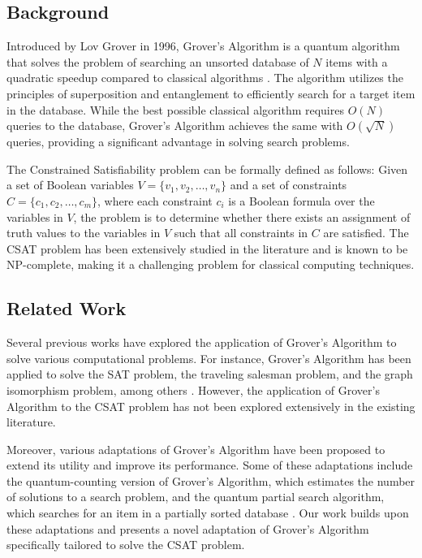 \subsection{Background}

Introduced by Lov Grover in 1996, Grover's Algorithm is a quantum algorithm that solves the problem of searching an unsorted database of $N$ items with a quadratic speedup compared to classical algorithms \cite{grover1996fast}. The algorithm utilizes the principles of superposition and entanglement to efficiently search for a target item in the database. While the best possible classical algorithm requires $O(N)$ queries to the database, Grover's Algorithm achieves the same with $O(\sqrt{N})$ queries, providing a significant advantage in solving search problems.

The Constrained Satisfiability problem can be formally defined as follows: Given a set of Boolean variables $V = \{v_1, v_2, \dots, v_n\}$ and a set of constraints $C = \{c_1, c_2, \dots, c_m\}$, where each constraint $c_i$ is a Boolean formula over the variables in $V$, the problem is to determine whether there exists an assignment of truth values to the variables in $V$ such that all constraints in $C$ are satisfied. The CSAT problem has been extensively studied in the literature and is known to be NP-complete, making it a challenging problem for classical computing techniques.

\subsection{Related Work}

Several previous works have explored the application of Grover's Algorithm to solve various computational problems. For instance, Grover's Algorithm has been applied to solve the SAT problem, the traveling salesman problem, and the graph isomorphism problem, among others \cite{brassard1998quantum,durr1996quantum,shenvi2002quantum}. However, the application of Grover's Algorithm to the CSAT problem has not been explored extensively in the existing literature.

Moreover, various adaptations of Grover's Algorithm have been proposed to extend its utility and improve its performance. Some of these adaptations include the quantum-counting version of Grover's Algorithm, which estimates the number of solutions to a search problem, and the quantum partial search algorithm, which searches for an item in a partially sorted database \cite{brassard1998quantum,boyer1998tight}. Our work builds upon these adaptations and presents a novel adaptation of Grover's Algorithm specifically tailored to solve the CSAT problem.

